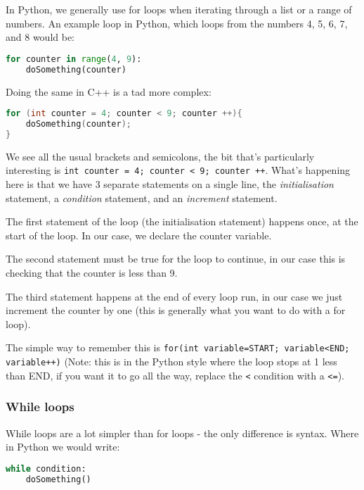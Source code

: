 In Python, we generally use for loops when iterating through a list or a
range of numbers. An example loop in Python, which loops from the
numbers 4, 5, 6, 7, and 8 would be:

\begin{lstlisting}[language=Python]
for counter in range(4, 9):
    doSomething(counter)
\end{lstlisting}

Doing the same in C++ is a tad more complex:

\begin{lstlisting}[language={C++}]
for (int counter = 4; counter < 9; counter ++){
    doSomething(counter);
}
\end{lstlisting}

We see all the usual brackets and semicolons, the bit that's
particularly interesting is
\lstinline!int counter = 4; counter < 9; counter ++!. What's happening
here is that we have 3 separate statements on a single line, the
\emph{initialisation} statement, a \emph{condition} statement, and an
\emph{increment} statement.

The first statement of the loop (the initialisation statement) happens
once, at the start of the loop. In our case, we declare the counter
variable.

The second statement must be true for the loop to continue, in our case
this is checking that the counter is less than 9.

The third statement happens at the end of every loop run, in our case we
just increment the counter by one (this is generally what you want to do
with a for loop).

The simple way to remember this is
\lstinline!for(int variable=START; variable<END; variable++)! (Note:
this is in the Python style where the loop stops at 1 less than END, if
you want it to go all the way, replace the \lstinline!<! condition with
a \lstinline!<=!).

\subsubsection{While loops}\label{while-loops}

While loops are a lot simpler than for loops - the only difference is
syntax. Where in Python we would write:

\begin{lstlisting}[language=Python]
while condition:
    doSomething()
\end{lstlisting}


